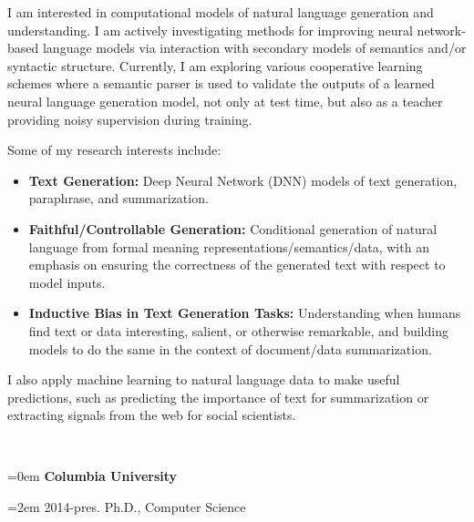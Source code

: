 \documentclass{scrartcl}
\newcommand{\MarginSection}[1]{\marginpar{#1}}
\begin{document}
\begin{cv}{}
I am interested in computational models of natural language generation and understanding. I am actively investigating methods for improving neural network-based language models via interaction with secondary models of semantics and/or syntactic structure. Currently, I am exploring various cooperative learning schemes where a semantic parser is used to validate the outputs of a learned neural language generation model, not only at test time, but also as a teacher providing noisy supervision during training. 

Some of my research interests include:

\begin{itemize}
    \item \textbf{Text Generation:} Deep Neural Network (DNN) models of text generation, paraphrase, and summarization.
    \item \textbf{Faithful/Controllable Generation:} Conditional generation of natural language from formal meaning representations/semantics/data, with an emphasis on ensuring the correctness of the generated text with respect to model inputs.
    \item \textbf{Inductive Bias in Text Generation Tasks:} Understanding when humans find text or data interesting, salient, or otherwise remarkable, and building models to do the same in the context of document/data summarization.
\end{itemize}


I also apply machine learning to natural language data to make useful predictions, such as predicting the importance of text for summarization or extracting signals from the web for social scientists.

 




 ~\\


{\noindent\hangindent=0em \MarginSection{Education}\textbf{Columbia University}

 \noindent\hangindent=2em 2014-pres. Ph.D., Computer Science 

}
\end{cv}
\end{document}
